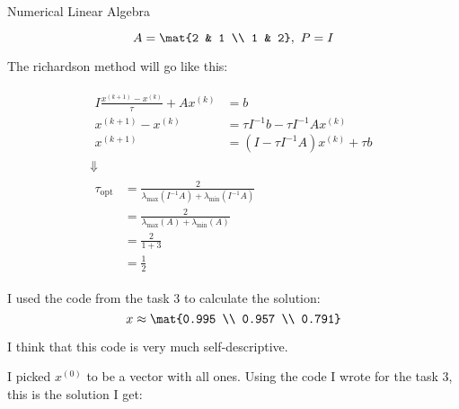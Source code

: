 \documentclass{article}
\begin{document}
    {Numerical Linear Algebra}

    \begin{tasks}
        \item {
            \begin{displaymath}
                A = \mat{2 & 1 \\ 1 & 2},\ 
                P = I
            \end{displaymath}

            The richardson method will go like this:

            \begin{displaymath}
                \begin{gathered}
                    \begin{aligned}
                        I\frac{x^{(k+1)}-x^{(k)}}{\tau} + Ax^{(k)} 
                        &= b \\
                        x^{(k+1)}-x^{(k)} 
                        &= \tau I^{-1}b - \tau I^{-1}Ax^{(k)} \\
                        x^{(k+1)}
                        &= (I - \tau I^{-1}A)x^{(k)} + \tau b
                    \end{aligned}
                    \\ \Downarrow \\
                    \begin{aligned}
                        \tau_\text{opt} 
                        &= \frac{2}{\lambda_\text{max}(I^{-1}A) + \lambda_\text{min}(I^{-1}A)} \\
                        &= \frac{2}{\lambda_\text{max}(A) + \lambda_\text{min}(A)} \\
                        &= \frac{2}{1 + 3} \\
                        &= \frac{1}{2}
                    \end{aligned}
                \end{gathered}
            \end{displaymath}
        }
        \item {
            I used the code from the task 3 to calculate the solution:
            \begin{displaymath}
                x \approx \mat{0.995 \\ 0.957 \\ 0.791}
            \end{displaymath}
        }
        \item {
            I think that this code is very much self-descriptive.
            
        }
        \item {
            I picked \(x^{(0)}\) to be a vector with all ones. Using the code I wrote for the task 3, this is the solution I get:
            
}
\end{tasks}
\end{document}
